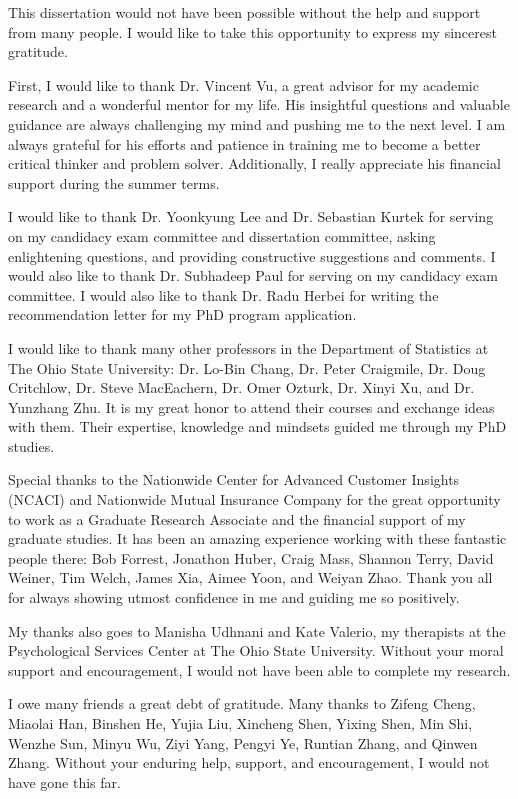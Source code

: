 \begin{acknowledgements}


This dissertation would not have been possible without the help and support from many people. I would like to take this opportunity to express my sincerest gratitude. 

First, I would like to thank Dr. Vincent Vu, a great advisor for my academic research and a wonderful mentor for my life. His insightful questions and valuable guidance are always challenging my mind and pushing me to the next level. I am always grateful for his efforts and patience in training me to become a better critical thinker and problem solver. Additionally, I really appreciate his financial support during the summer terms. 

I would like to thank Dr. Yoonkyung Lee and Dr. Sebastian Kurtek for serving on my candidacy exam committee and dissertation committee, asking enlightening questions, and providing constructive suggestions and comments. I would also like to thank Dr. Subhadeep Paul for serving on my candidacy exam committee. I would also like to thank Dr. Radu Herbei for writing the recommendation letter for my PhD program application. 

I would like to thank many other professors in the Department of Statistics at The Ohio State University: Dr. Lo-Bin Chang, Dr. Peter Craigmile, Dr. Doug Critchlow, Dr. Steve MacEachern, Dr. Omer Ozturk, Dr. Xinyi Xu, and Dr. Yunzhang Zhu. It is my great honor to attend their courses and exchange ideas with them. Their expertise, knowledge and mindsets guided me through my PhD studies. 

Special thanks to the Nationwide Center for Advanced Customer Insights (NCACI) and Nationwide Mutual Insurance Company for the great opportunity to work as a Graduate Research Associate and the financial support of my graduate studies. It has been an amazing experience working  with these fantastic people there: Bob Forrest, Jonathon Huber, Craig Mass, Shannon Terry, David Weiner, Tim Welch, James Xia, Aimee Yoon, and Weiyan Zhao. Thank you all for always showing utmost confidence in me and guiding me so positively. 

My thanks also goes to Manisha Udhnani and Kate Valerio,  my therapists at the Psychological Services Center at The Ohio State University. Without your moral support and encouragement, I would not have been able to complete my research. 

I owe many friends a great debt of gratitude. Many thanks to Zifeng Cheng, Miaolai Han, Binshen He, Yujia Liu, Xincheng Shen, Yixing Shen, Min Shi, Wenzhe Sun, Minyu Wu, Ziyi Yang, Pengyi Ye, Runtian Zhang, and Qinwen Zhang. Without your enduring help, support, and encouragement, I would not have gone this far. 


\end{acknowledgements}

